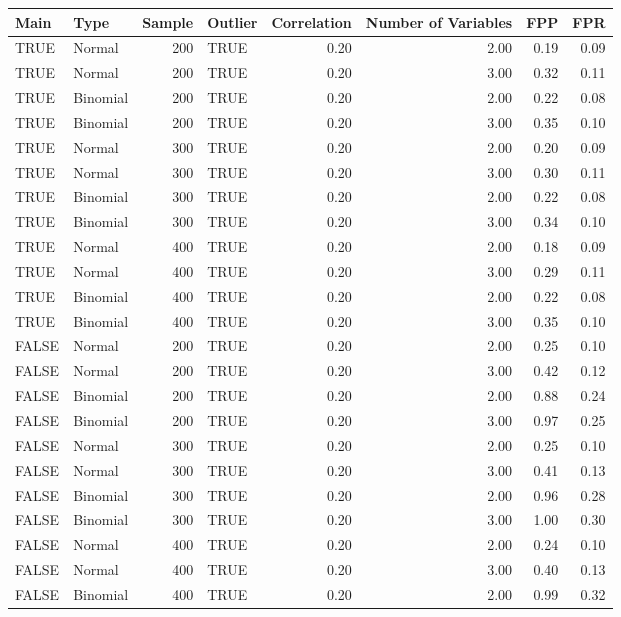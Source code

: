\begin{longtable}{llrlrrrr}
  \hline
Main & Type & Sample & Outlier & Correlation & Number of Variables & FPP & FPR \\ 
  \hline
TRUE & Normal & 200 & TRUE & 0.20 & 2.00 & 0.19 & 0.09 \\ 
  TRUE & Normal & 200 & TRUE & 0.20 & 3.00 & 0.32 & 0.11 \\ 
  TRUE & Binomial & 200 & TRUE & 0.20 & 2.00 & 0.22 & 0.08 \\ 
  TRUE & Binomial & 200 & TRUE & 0.20 & 3.00 & 0.35 & 0.10 \\ 
  TRUE & Normal & 300 & TRUE & 0.20 & 2.00 & 0.20 & 0.09 \\ 
  TRUE & Normal & 300 & TRUE & 0.20 & 3.00 & 0.30 & 0.11 \\ 
  TRUE & Binomial & 300 & TRUE & 0.20 & 2.00 & 0.22 & 0.08 \\ 
  TRUE & Binomial & 300 & TRUE & 0.20 & 3.00 & 0.34 & 0.10 \\ 
  TRUE & Normal & 400 & TRUE & 0.20 & 2.00 & 0.18 & 0.09 \\ 
  TRUE & Normal & 400 & TRUE & 0.20 & 3.00 & 0.29 & 0.11 \\ 
  TRUE & Binomial & 400 & TRUE & 0.20 & 2.00 & 0.22 & 0.08 \\ 
  TRUE & Binomial & 400 & TRUE & 0.20 & 3.00 & 0.35 & 0.10 \\ 
  FALSE & Normal & 200 & TRUE & 0.20 & 2.00 & 0.25 & 0.10 \\ 
  FALSE & Normal & 200 & TRUE & 0.20 & 3.00 & 0.42 & 0.12 \\ 
  FALSE & Binomial & 200 & TRUE & 0.20 & 2.00 & 0.88 & 0.24 \\ 
  FALSE & Binomial & 200 & TRUE & 0.20 & 3.00 & 0.97 & 0.25 \\ 
  FALSE & Normal & 300 & TRUE & 0.20 & 2.00 & 0.25 & 0.10 \\ 
  FALSE & Normal & 300 & TRUE & 0.20 & 3.00 & 0.41 & 0.13 \\ 
  FALSE & Binomial & 300 & TRUE & 0.20 & 2.00 & 0.96 & 0.28 \\ 
  FALSE & Binomial & 300 & TRUE & 0.20 & 3.00 & 1.00 & 0.30 \\ 
  FALSE & Normal & 400 & TRUE & 0.20 & 2.00 & 0.24 & 0.10 \\ 
  FALSE & Normal & 400 & TRUE & 0.20 & 3.00 & 0.40 & 0.13 \\ 
  FALSE & Binomial & 400 & TRUE & 0.20 & 2.00 & 0.99 & 0.32 \\ 

\end{longtable}
